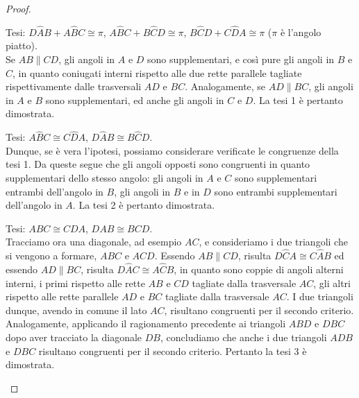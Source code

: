 \begin{proof}~\\
  \begin{enumerate*}
    
    \item Tesi: \(D\widehat{A}B+A\widehat{B}C\cong\pi\), 
    \(A\widehat{B}C+B\widehat{C}D\cong\pi\), 
    \(B\widehat{C}D+C\widehat{D}A\cong\pi\) (\(\pi\) è l'angolo piatto).\\
    Se \(AB\parallel CD\), gli angoli in \(A\) e \(D\) sono supplementari, e 
    così pure gli angoli in \(B\) e \(C\), in quanto coniugati interni 
    rispetto alle due rette parallele tagliate rispettivamente dalle 
    trasversali \(AD\) e \(BC\). Analogamente, se \(AD\parallel BC\), gli 
    angoli in \(A\) e \(B\) sono supplementari, ed anche gli angoli in \(C\) e 
    \(D\). La tesi 1 è pertanto dimostrata.
    
    \item Tesi: \(A\widehat{B}C\cong C\widehat{D}A\), \(D\widehat{A}B\cong 
    B\widehat{C}D\).\\
    Dunque, se è vera l'ipotesi, possiamo considerare verificate le 
    congruenze della tesi 1. Da queste segue che gli angoli opposti sono 
    congruenti in quanto supplementari dello stesso angolo: gli angoli in 
    \(A\) e \(C\) sono supplementari entrambi dell'angolo in \(B\), gli angoli 
    in \(B\) e in \(D\) sono entrambi supplementari dell'angolo in \(A\). La 
    tesi 2 è pertanto dimostrata.
    
    \item Tesi: \(ABC\cong CDA\), \(DAB\cong BCD\).\\
    Tracciamo ora una diagonale, ad esempio \(AC\), e consideriamo i due 
    triangoli che si vengono a formare, \(ABC\) e \(ACD\). Essendo 
    \(AB\parallel CD\), risulta \(D\widehat{C}A\cong C\widehat{A}B\) ed 
    essendo \(AD\parallel BC\), risulta \(D\widehat{A}C\cong A\widehat{C}B\), 
    in quanto sono coppie di angoli alterni interni, i primi rispetto 
    alle rette \(AB\) e \(CD\) tagliate dalla trasversale \(AC\), gli altri 
    rispetto alle rette parallele \(AD\) e \(BC\) tagliate dalla trasversale 
    \(AC\). I due triangoli dunque, avendo in comune il lato \(AC\), 
    risultano congruenti per il secondo criterio. Analogamente, applicando 
    il ragionamento precedente ai triangoli \(ABD\) e \(DBC\) dopo aver 
    tracciato la diagonale \(DB\), concludiamo che anche i due triangoli 
    \(ADB\) e \(DBC\) risultano congruenti per il secondo criterio. Pertanto 
    la tesi 3 è dimostrata.
    

\end{enumerate*}
\end{proof}
